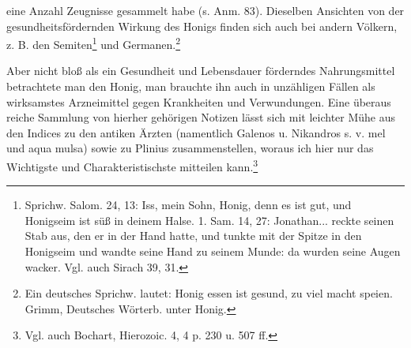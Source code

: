 \documentclass[a4paper, 11pt, oneside]{article}
\begin{document}
eine Anzahl Zeugnisse gesammelt habe (s. Anm. 83). Dieselben Ansichten von der gesundheitsfördernden Wirkung des Honigs finden sich auch bei andern Völkern, z. B. den Semiten\footnote{Sprichw. Salom. 24, 13: Iss, mein Sohn, Honig, denn es ist gut, und Honigseim ist süß in deinem Halse. 1. Sam. 14, 27: Jonathan... reckte seinen Stab aus, den er in der Hand hatte, und tunkte mit der Spitze in den Honigseim und wandte seine Hand zu seinem Munde: da wurden seine Augen wacker. Vgl. auch Sirach 39, 31.} und Germanen.\footnote{Ein deutsches Sprichw. lautet: Honig essen ist gesund, zu viel macht speien. Grimm, Deutsches Wörterb. unter Honig.}

Aber nicht bloß als ein Gesundheit und Lebensdauer förderndes Nahrungsmittel betrachtete man den Honig, man brauchte ihn auch in unzähligen Fällen als wirksamstes Arzneimittel gegen Krankheiten und Verwundungen. Eine überaus reiche Sammlung von hierher gehörigen Notizen lässt sich mit leichter Mühe aus den Indices zu den antiken Ärzten (namentlich Galenos u. Nikandros s. v. mel und aqua mulsa) sowie zu Plinius zusammenstellen, woraus ich hier nur das Wichtigste und Charakteristischste mitteilen kann.\footnote{Vgl. auch Bochart, Hierozoic. 4, 4 p. 230 u. 507 ff.}
\end{document}
